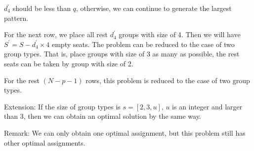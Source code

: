 $d_4^{'}$ should be less than $q$, otherwise, we can continue to generate the largest pattern.

For the next row, we place all rest $d_4^{'}$ groups with size of 4. Then we will have $S^{'} = S - d_4^{'} \times 4$ empty seats. The problem can be reduced to the case of two group types. That is, place groups with size of 3 as many as possible, the rest seats can be taken by group with size of 2.

For the rest $(N-p-1)$ rows, this problem is reduced to the case of two group types.

Extension: If the size of group types is $s = [2,3,u]$, $u$ is an integer and larger than 3, then we can obtain an optimal solution by the same way.

Remark: We can only obtain one optimal assignment, but this problem still has other optimal assignments.


%
%
%
%



%
%
%
%

